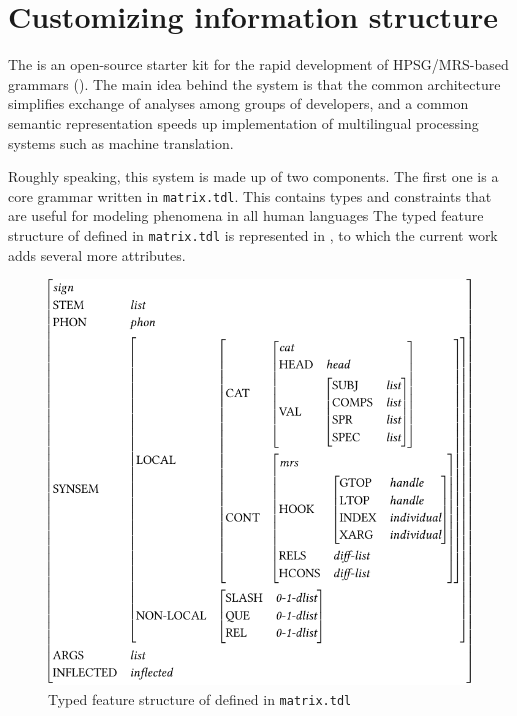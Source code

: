 \chapter{Customizing information structure}
\label{chapter11}
\setcounter{enums}{0}


The \lingo {} is an open-source starter kit for the
rapid development of HPSG/MRS-based grammars
(\citealt{bender:etal:10}).  The main idea behind the system is that
the common architecture simplifies exchange of analyses among groups
of developers, and a common semantic representation speeds up
implementation of multilingual processing systems such as machine
translation.



Roughly speaking, this system is made up of two components.  The first
one is a core grammar written in \texttt{matrix.tdl}. This contains
types and constraints that are useful for modeling phenomena in all
human languages The typed feature structure of  defined in
\texttt{matrix.tdl} is represented in , to
which the current work adds several more attributes.

\begin{figure}
\caption{Typed feature structure of  defined in
\texttt{matrix.tdl}}
\label{avm:sign-matrix}
\includegraphics[width=.9\textwidth]{pdf/sign-matrix.pdf}
\end{figure}

